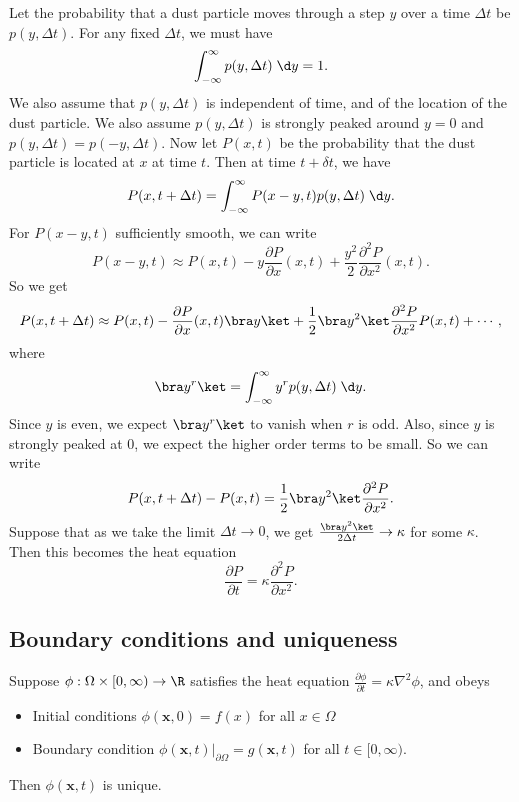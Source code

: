 \documentclass[a4paper]{article}
\begin{document}
Let the probability that a dust particle moves through a step $y$ over a time $\Delta t$ be $p(y, \Delta t)$. For any fixed $\Delta t$, we must have
\[
  \int_{-\infty}^\infty p(y, \Delta t)\;\d y = 1.
\]
We also assume that $p(y, \Delta t)$ is independent of time, and of the location of the dust particle. We also assume $p(y, \Delta t)$ is strongly peaked around $y = 0$ and $p(y, \Delta t) = p(-y, \Delta t)$. Now let $P(x, t)$ be the probability that the dust particle is located at $x$ at time $t$. Then at time $t + \delta t$, we have
\[
  P(x, t + \Delta t) = \int_{-\infty}^\infty P(x - y, t) p(y, \Delta t)\;\d y.
\]
For $P(x - y, t)$ sufficiently smooth, we can write
\[
  P(x - y, t) \approx P(x, t)- y\frac{\partial P}{\partial x}(x, t) + \frac{y^2}{2}\frac{\partial^2 P}{\partial x^2}(x, t).
\]
So we get
\[
  P(x, t + \Delta t) \approx P(x, t) - \frac{\partial P}{\partial x}(x, t) \bra y \ket + \frac{1}{2} \bra y^2\ket \frac{\partial^2 P}{\partial x^2}P(x, t) + \cdots,
\]
where
\[
  \bra y^r\ket = \int_{-\infty}^\infty y^r p(y, \Delta t)\;\d y.
\]
Since $y$ is even, we expect $\bra y^r\ket$ to vanish when $r$ is odd. Also, since $y$ is strongly peaked at $0$, we expect the higher order terms to be small. So we can write
\[
  P(x, t + \Delta t) - P(x, t) = \frac{1}{2}\bra y^2\ket \frac{\partial^2 P}{\partial x^2}.
\]
Suppose that as we take the limit $\Delta t \to 0$, we get $\frac{\bra y^2\ket }{2 \Delta t} \to \kappa$ for some $\kappa$. Then this becomes the heat equation
\[
  \frac{\partial P}{\partial t} = \kappa \frac{\partial^2 P}{\partial x^2}.
\]
\subsection{Boundary conditions and uniqueness}
\begin{prop}
  Suppose $\phi: \Omega\times [0, \infty) \to \R$ satisfies the heat equation $\frac{\partial \phi}{\partial t} = \kappa \nabla^2 \phi$, and obeys
  \begin{itemize}
    \item Initial conditions $\phi(\mathbf{x}, 0) = f(x)$ for all $x \in \Omega$
    \item Boundary condition $\phi(\mathbf{x}, t) |_{\partial \Omega} = g(\mathbf{x}, t)$ for all $t \in [0, \infty)$.
  \end{itemize}
  Then $\phi(\mathbf{x}, t)$ is unique.
\end{prop}
\end{document}
